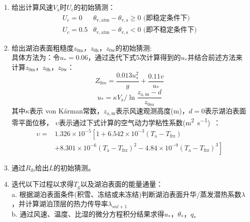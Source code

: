 \begin{enumerate}
  \item 给出计算风速$V_{\mathrm {a}} $时$U_{\mathrm {c}} $的初始猜测：
    \begin{equation}
      \begin{array}{ll}
        U_{\mathrm{c}}=0 & \theta_{\mathrm{v, atm}}-\theta_{\mathrm{v, s}} \geqslant 0 \text{ (即稳定条件下)} \\
        U_{\mathrm{c}}=0.5 & \theta_{\mathrm{v, atm}}-\theta_{\mathrm{v, s}}<0 \text{ (即不稳定条件下)}
      \end{array}
    \end{equation}
  \item 给出湖泊表面粗糙度$z_{\mathrm{0m}}$，$z_{\mathrm{0h}}$，$z_{\mathrm{0w}}$的初始猜测:\\
    具体方法为：令$u_\ast=0.06$，通过迭代下式5次计算得到的$u_\ast$并结合前述方法来计算$z_{\mathrm{0m}}$，$z_{\mathrm{0h}}$，$z_{\mathrm{0w}}$：
    \begin{equation}
      Z_{0 m}=\frac{0.013 u_{*}^{2}}{g}+\frac{0.11 v}{u_{*}}
    \end{equation}
    \begin{equation}
      u_{*}=\kappa V_{\mathrm{a}} / \ln \frac{z_{\mathrm{a, m}}-d}{z_{0 m}}
    \end{equation}
    其中$\kappa$表示 von K\'arman常数，$z_{\mathrm{a,m}}$表示风速观测高度(m)，$d=0$表示湖泊表面零平面位移，
    $\upsilon$表示通过下式计算的空气动力学粘性系数(\unit{m^2.s^{-1}})~\citep{andreas1989thermal}：
    \begin{equation}
      \begin{array}{cl}
        \upsilon=&1.326\times{10}^{-5}\left[1+6.542\times{10}^{-3}\left(T_{\mathrm{a}}-T_{\mathrm {frz}} \right)\right.\\
        & \left. +8.301\times{10}^{-6}\left(T_{\mathrm{a}}-T_{\mathrm {frz}} \right)^2-4.84\times{10}^{-9}\left(T_{\mathrm{a}}-T_{\mathrm {frz}} \right)^3\right]
      \end{array}
    \end{equation}
  \item 通过$R_{\mathrm{ib}}$给出$L$的初始猜测。
  \item 迭代以下过程以求得$T_{\mathrm {g}} $以及湖泊表面的能量通量：\\
    a. 根据湖泊表面条件(积雪、冻结或未冻结)判断湖泊表面升华/蒸发潜热系数$\lambda$，并计算湖泊顶层的热力传导率$\lambda_{snl+1}$ \\
    b. 通过风速、温度、比湿的微分方程积分结果求得$u_\ast$，$\theta_\ast$，$q_\ast$ \\

\end{enumerate}
